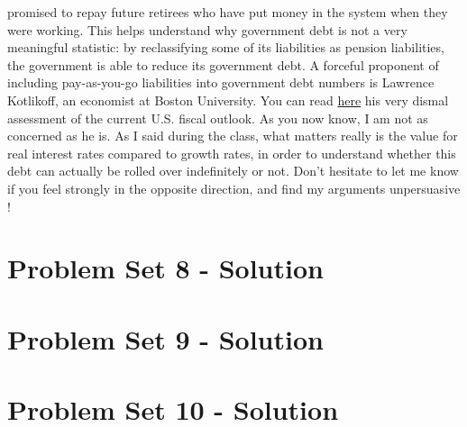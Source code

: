 \documentclass[]{book}
\theoremstyle{definition}
\theoremstyle{definition}
\theoremstyle{definition}
\theoremstyle{remark}
\begin{document}
\begin{enumerate}
  promised to repay future retirees who have put money in the system
  when they were working. This helps understand why government debt is
  not a very meaningful statistic: by reclassifying some of its
  liabilities as pension liabilities, the government is able to reduce
  its government debt. A forceful proponent of including pay-as-you-go
  liabilities into government debt numbers is Lawrence Kotlikoff, an
  economist at Boston University. You can read
  \href{https://www.kotlikoff.net/sites/default/files/Kotlikoffbudgetcom2-25-2015.pdf}{here}
  his very dismal assessment of the current U.S. fiscal outlook. As you
  now know, I am not as concerned as he is. As I said during the class,
  what matters really is the value for real interest rates compared to
  growth rates, in order to understand whether this debt can actually be
  rolled over indefinitely or not. Don't hesitate to let me know if you
  feel strongly in the opposite direction, and find my arguments
  unpersuasive !
\end{enumerate}

\hypertarget{pset8-sol}{\chapter{Problem Set 8 -
Solution}\label{pset8-sol}}

\hypertarget{pset9-sol}{\chapter{Problem Set 9 -
Solution}\label{pset9-sol}}

\hypertarget{pset10-sol}{\chapter{Problem Set 10 -
Solution}\label{pset10-sol}}


\end{document}
